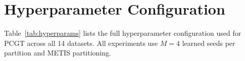 \documentclass[manuscript, screen, review, anonymous]{acmart}
\begin{document}






\appendix

\section{Hyperparameter Configuration}
\label{app:hyperparams}

Table~\ref{tab:hyperparams} lists the full hyperparameter configuration used for PCGT across all 14 datasets. All experiments use $M=4$ learned seeds per partition and METIS partitioning.
\end{document}
